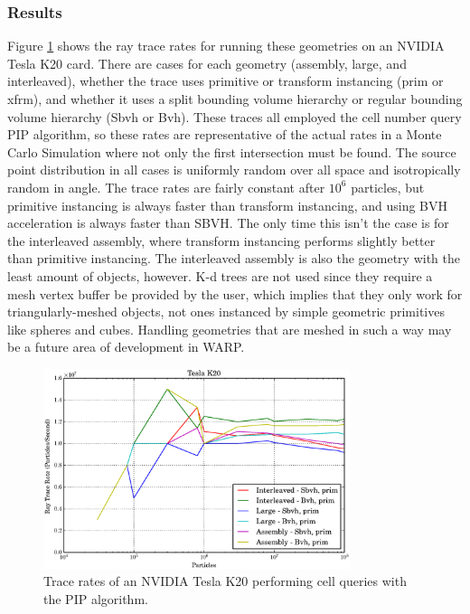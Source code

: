 \subsubsection{Results}

Figure \ref{prelim_optix_k20} shows the ray trace rates for running these geometries on an NVIDIA Tesla K20 card.  There are cases for each geometry (assembly, large, and interleaved), whether the trace uses primitive or transform instancing (prim or xfrm), and whether it uses a split bounding volume hierarchy or regular bounding volume hierarchy (Sbvh or Bvh).  These traces all employed the cell number query PIP algorithm, so these rates are representative of the actual rates in a Monte Carlo Simulation where not only the first intersection must be found.  The source point distribution in all cases is uniformly random over all space and isotropically random in angle.  The trace rates are fairly constant after $10^6$ particles, but primitive instancing is always faster than transform instancing, and using BVH acceleration is always faster than SBVH.   The only time this isn't the case is for the interleaved assembly, where transform instancing performs slightly better than primitive instancing.  The interleaved assembly is also the geometry with the least amount of objects, however.  K-d trees are not used since they require a mesh vertex buffer be provided by the user, which implies that they only work for triangularly-meshed objects, not ones instanced by simple geometric primitives like spheres and cubes.  Handling geometries that are meshed in such a way may be a future area of development in WARP.

\begin{figure}[h!] 
  \centering
    \includegraphics[width=0.8\textwidth]{graphics/prelim_optix_k20.eps}
     \caption{Trace rates of an NVIDIA Tesla K20 performing cell queries with the PIP algorithm. \label{prelim_optix_k20} }
\end{figure}

